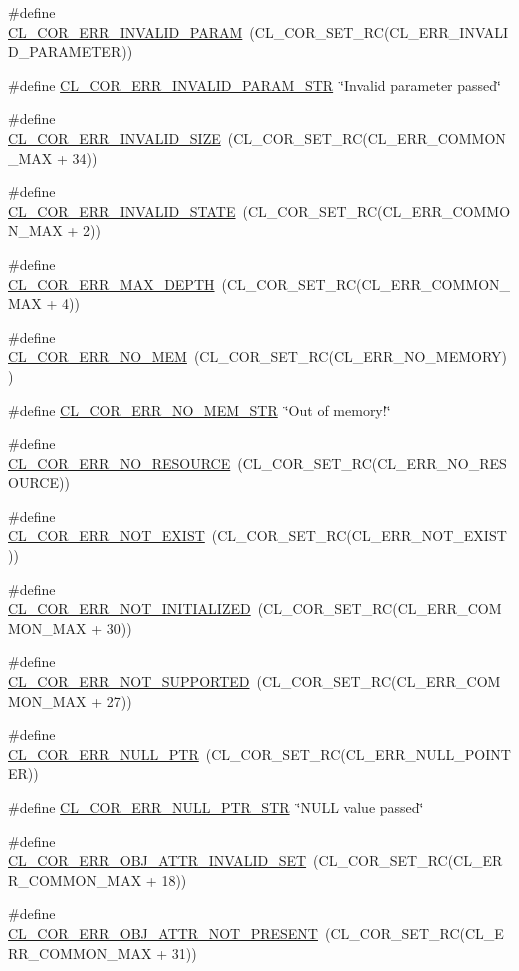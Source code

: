 \begin{CompactItemize}
\#define \hyperlink{group__group13_ga147}{CL\_\-COR\_\-ERR\_\-INVALID\_\-PARAM}~(CL\_\-COR\_\-SET\_\-RC(CL\_\-ERR\_\-INVALID\_\-PARAMETER))
\item 
\#define \hyperlink{group__group13_ga263}{CL\_\-COR\_\-ERR\_\-INVALID\_\-PARAM\_\-STR}~\char`\"{}Invalid parameter passed\char`\"{}
\item 
\#define \hyperlink{group__group13_ga189}{CL\_\-COR\_\-ERR\_\-INVALID\_\-SIZE}~(CL\_\-COR\_\-SET\_\-RC(CL\_\-ERR\_\-COMMON\_\-MAX + 34))
\item 
\#define \hyperlink{group__group13_ga157}{CL\_\-COR\_\-ERR\_\-INVALID\_\-STATE}~(CL\_\-COR\_\-SET\_\-RC(CL\_\-ERR\_\-COMMON\_\-MAX + 2))
\item 
\#define \hyperlink{group__group13_ga159}{CL\_\-COR\_\-ERR\_\-MAX\_\-DEPTH}~(CL\_\-COR\_\-SET\_\-RC(CL\_\-ERR\_\-COMMON\_\-MAX + 4))
\item 
\#define \hyperlink{group__group13_ga146}{CL\_\-COR\_\-ERR\_\-NO\_\-MEM}~(CL\_\-COR\_\-SET\_\-RC(CL\_\-ERR\_\-NO\_\-MEMORY))
\item 
\#define \hyperlink{group__group13_ga265}{CL\_\-COR\_\-ERR\_\-NO\_\-MEM\_\-STR}~\char`\"{}Out of memory!\char`\"{}
\item 
\#define \hyperlink{group__group13_ga154}{CL\_\-COR\_\-ERR\_\-NO\_\-RESOURCE}~(CL\_\-COR\_\-SET\_\-RC(CL\_\-ERR\_\-NO\_\-RESOURCE))
\item 
\#define \hyperlink{group__group13_ga149}{CL\_\-COR\_\-ERR\_\-NOT\_\-EXIST}~(CL\_\-COR\_\-SET\_\-RC(CL\_\-ERR\_\-NOT\_\-EXIST))
\item 
\#define \hyperlink{group__group13_ga185}{CL\_\-COR\_\-ERR\_\-NOT\_\-INITIALIZED}~(CL\_\-COR\_\-SET\_\-RC(CL\_\-ERR\_\-COMMON\_\-MAX + 30))
\item 
\#define \hyperlink{group__group13_ga182}{CL\_\-COR\_\-ERR\_\-NOT\_\-SUPPORTED}~(CL\_\-COR\_\-SET\_\-RC(CL\_\-ERR\_\-COMMON\_\-MAX + 27))
\item 
\#define \hyperlink{group__group13_ga148}{CL\_\-COR\_\-ERR\_\-NULL\_\-PTR}~(CL\_\-COR\_\-SET\_\-RC(CL\_\-ERR\_\-NULL\_\-POINTER))
\item 
\#define \hyperlink{group__group13_ga264}{CL\_\-COR\_\-ERR\_\-NULL\_\-PTR\_\-STR}~\char`\"{}NULL value passed\char`\"{}
\item 
\#define \hyperlink{group__group13_ga173}{CL\_\-COR\_\-ERR\_\-OBJ\_\-ATTR\_\-INVALID\_\-SET}~(CL\_\-COR\_\-SET\_\-RC(CL\_\-ERR\_\-COMMON\_\-MAX + 18))
\item 
\#define \hyperlink{group__group13_ga186}{CL\_\-COR\_\-ERR\_\-OBJ\_\-ATTR\_\-NOT\_\-PRESENT}~(CL\_\-COR\_\-SET\_\-RC(CL\_\-ERR\_\-COMMON\_\-MAX + 31))

\end{CompactItemize}
